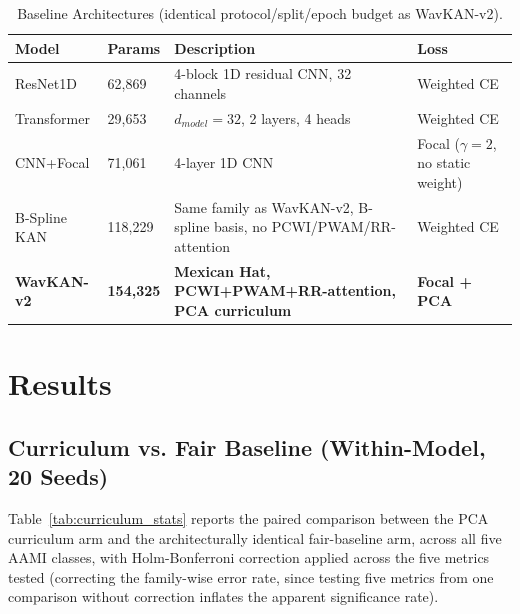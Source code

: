 \documentclass[journal,twoside,web]{ieeecolor}
\begin{document}
\begin{table}[!t]
\caption{Baseline Architectures (identical protocol/split/epoch budget as WavKAN-v2).}
\label{tab:baselines}
\centering
\footnotesize
\begin{tabular}{@{}l l l l@{}}
\toprule
\textbf{Model} & \textbf{Params} & \textbf{Description} & \textbf{Loss} \\ \midrule
ResNet1D & 62,869 & 4-block 1D residual CNN, 32 channels & Weighted CE \\
Transformer & 29,653 & $d_{model}{=}32$, 2 layers, 4 heads & Weighted CE \\
CNN+Focal & 71,061 & 4-layer 1D CNN & Focal ($\gamma{=}2$, no static weight) \\
B-Spline KAN & 118,229 & Same family as WavKAN-v2, B-spline basis, no PCWI/PWAM/RR-attention & Weighted CE \\
\textbf{WavKAN-v2} & \textbf{154,325} & \textbf{Mexican Hat, PCWI+PWAM+RR-attention, PCA curriculum} & \textbf{Focal + PCA} \\ \bottomrule
\end{tabular}
\end{table}

\section{Results}
\label{sec:results}

\subsection{Curriculum vs. Fair Baseline (Within-Model, 20 Seeds)}
\label{sec:results_curriculum}
Table~\ref{tab:curriculum_stats} reports the paired comparison between the PCA curriculum arm and the architecturally identical fair-baseline arm, across all five AAMI classes, with Holm-Bonferroni correction applied across the five metrics tested (correcting the family-wise error rate, since testing five metrics from one comparison without correction inflates the apparent significance rate).
\end{document}
